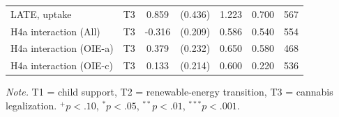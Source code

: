 \begin{table}[htbp]
\begin{threeparttable}
\begin{tabular}{lcccccc}
  LATE, uptake & T3 & 0.859 & (0.436) & 1.223 & 0.700 & 567 \\
  H4a interaction (All) & T3 & -0.316 & (0.209) & 0.586 & 0.540 & 554 \\
  H4a interaction (OIE-a) & T3 & 0.379 & (0.232) & 0.650 & 0.580 & 468 \\
  H4a interaction (OIE-c) & T3 & 0.133 & (0.214) & 0.600 & 0.220 & 536 \\
\bottomrule
\end{tabular}
\begin{tablenotes}\footnotesize\item \textit{Note.} T1 = child support, T2 = renewable-energy transition, T3 = cannabis legalization. $^{+}p<.10$, $^{*}p<.05$, $^{**}p<.01$, $^{***}p<.001$.\end{tablenotes}
\end{threeparttable}
\end{table}
